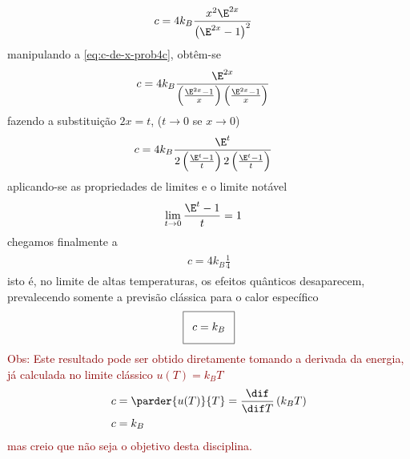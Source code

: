 \begin{prob}
\begin{sol}
\begin{enumerate}[label=\alph *)]
      \begin{align}
        \label{eq:c-de-x-prob4c}
        c&=4k_B\frac{x^2\E^{2x}}{\left(\E^{2x}-1\right)^2}
      \end{align}
      manipulando a \eqref{eq:c-de-x-prob4c}, obtêm-se
      \begin{align}
        \begin{split}
          c&=4k_B\frac{\E^{2x}}{\left(\frac{\E^{2x}-1}{x}\right)\left(\frac{\E^{2x}-1}{x}\right)}
        \end{split}
      \end{align}
      fazendo a substituição $2x=t$, ($t\to 0$ se $x\to 0$)
      \begin{align}
        \begin{split}
          c&=4k_B\frac{\E^t}{2\left(\frac{\E^t-1}{t}\right)2\left(\frac{\E^t-1}{t}\right)}
        \end{split}
      \end{align}
      aplicando-se as propriedades de limites e o limite notável
      \begin{align}
        \lim_{t\to 0}\frac{\E^t-1}{t}&=1
      \end{align}
      chegamos finalmente a
      \begin{align}        
        \begin{split}
          c=4k_B\frac{1}{4}          
        \end{split}
      \end{align}
      isto é, no limite de altas temperaturas, os efeitos quânticos desaparecem, prevalecendo somente a previsão clássica para o calor específico
      \begin{align}
        \addtolength{\fboxsep}{5pt}
        \boxed{
          \begin{gathered}
            c=k_B
          \end{gathered}
        }
      \end{align}
      \textcolor {darkred} {
        Obs: Este resultado pode ser obtido diretamente tomando a derivada da energia, já calculada no limite clássico $u(T)=k_BT$
        \begin{align}
          c&=\parder{u(T)}{T}=\frac{\dif}{\dif T}\left(k_BT\right)\nonumber\\
          c&=k_B\nonumber
        \end{align}
        mas creio que não seja o objetivo desta disciplina.
      }
    \end{enumerate}
  \end{sol}
\end{prob}
